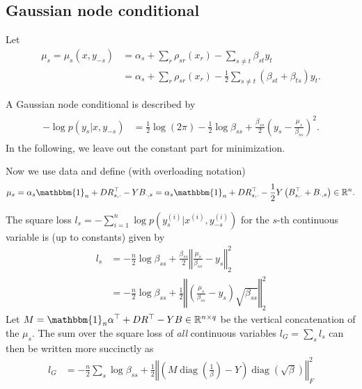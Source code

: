 \documentclass{article}
\newcommand{\oneVec}{\mathbbm{1}}
\newcommand{\IR}{{\mathbb{R}}}\newcommand{\IN}{{\mathbb{N}}}
\newcommand{\bPe}[1]{\ensuremath{\left[#1 \right]}} %
\newcommand{\bPr}[1]{\ensuremath{\left(#1 \right)}} %
\newcommand{\bNorm}[1]{\left\Vert #1\right\Vert} %
\DeclareMathOperator{\diag}{diag}
\begin{document}
\subsection{Gaussian node conditional}

Let
\begin{align*}
\mu_s = \mu_s(x, y_{-s})&= \alpha_s+\sum_r \rho_{sr}(x_r)-\sum_{s\neq t}\beta_{st}y_t \\
&= \alpha_s+\sum_r \rho_{sr}(x_r)-\frac{1}{2}\sum_{s\neq t}\bPr{\beta_{st} + \beta_{ts}}y_t. 
\end{align*}

A Gaussian node conditional is described by
\begin{align}
\begin{split}
-\log p(y_s|x, y_{-s}) &= \frac{1}{2}\log(2\pi)-\frac{1}{2}\log \beta_{ss} + \frac{\beta_{ss}}{2}\left(y_s - \frac{\mu_s}{\beta_{ss}}\right)^2.
\end{split}\label{nc_gauss3}
\end{align}
In the following, we leave out the constant part for minimization.
\medskip

Now we use data and define (with overloading notation)
\begin{align*}
\mu_s = \alpha_s\oneVec_n + D R_{s, \cdot}^\top - Y B_{\cdot, s} = \alpha_s\oneVec_n + D R_{s, \cdot}^\top - \frac{1}{2}Y \bPr{B_{s, \cdot}^\top +B_{\cdot, s}}\in\IR^{n}.
\end{align*}

The square loss $l_s=-\sum_{i=1}^n \log p(y_s^{(i)}|x^{(i)}, y_{-s}^{(i)})$ for the $s$-th continuous variable is (up to constants) given by
\begin{align*}
l_s &=-\frac{n}{2} \log \beta_{ss} + \frac{\beta_{ss}}{2} \bNorm{\frac{\mu_s}{\beta_{ss}} - y_s }_2^2 \\ %
&=-\frac{n}{2} \log \beta_{ss} + \frac{1}{2} \bNorm{\bPr{\frac{\mu_s}{\beta_{ss}} - y_s }\sqrt{\beta_{ss}} }_2^2
\end{align*}
Let $M= \oneVec_n \alpha^\top + D R^\top - Y B\in\IR^{n\times q}$ be the vertical concatenation of the $\mu_s$.
The sum over the square loss of \emph{all} continuous variables $l_G = \sum_s l_s$ can then be written more succinctly as
\begin{align*}
l_G &=-\frac{n}{2} \sum_s \log \beta_{ss} + \frac{1}{2} \bNorm{\bPr{M\diag\bPr{\frac{1}{\beta}} - Y} \diag\bPr{\sqrt{\beta}} }_F^2 %
\end{align*}
\end{document}
